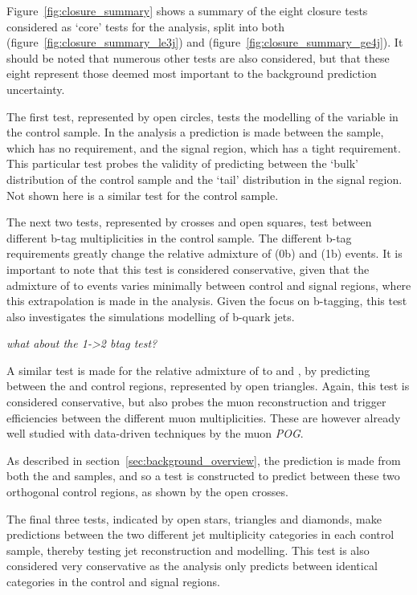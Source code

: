 Figure~\ref{fig:closure_summary} shows a summary of the eight closure tests 
considered as `core' tests for the analysis, split into both
\njlow (figure~\ref{fig:closure_summary_le3j}) 
and \njhigh (figure~\ref{fig:closure_summary_ge4j}). It should be noted that 
numerous other tests are also considered, but that these eight represent those 
deemed most important to the background prediction uncertainty.

The first test, represented by open circles, tests the modelling of the \alphat 
variable in the \mj control sample. In the analysis a prediction is made 
between the \mj sample, which has no \alphat requirement, and the 
signal region, which has a tight \alphat requirement. This particular test 
probes
the validity of predicting between the `bulk' distribution of the control sample
and the `tail' distribution in the signal region. Not shown here is a similar test
for the \mmj control sample.

The next two tests, represented by crosses and open squares, test between 
different b-tag multiplicities in the \mj control sample. The different b-tag 
requirements greatly change the relative admixture of \wj (0b) and \ttj (1b) events. 
 It is important to note that this test is 
considered conservative, given that the admixture of \wj to \ttj events 
varies minimally between control and signal regions, where this extrapolation is 
made in the analysis. Given the focus on b-tagging, this test also investigates
the simulations modelling of b-quark jets.

\emph{what about the 1->2 btag \mj test?}

A similar test is made for the relative admixture of \zj to \wj and \ttj, by 
predicting between the \mj and \mmj control regions, represented by open 
triangles. Again, this test is considered 
conservative, but also probes the muon reconstruction and trigger efficiencies 
between the different muon multiplicities. These are however already well 
studied with data-driven techniques by the muon \emph{POG}.

As described in section~\ref{sec:background_overview}, the \zinv prediction 
is made from both the \gj and \mmj samples, and so a test is constructed to 
predict between these two orthogonal control regions, as shown by the open 
crosses.

The final three tests, indicated by open stars, triangles and diamonds, make 
predictions between the two different jet multiplicity categories in each 
control sample, thereby 
testing jet reconstruction and modelling. This test is also considered very 
conservative as the analysis only predicts between identical \nj categories in 
the control and signal regions.

